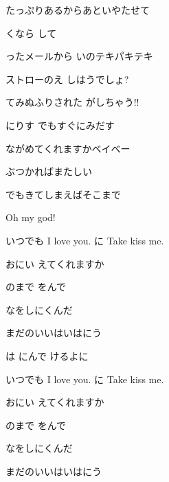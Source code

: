 \documentclass[14pt]{ltjsarticle}
\begin{document}
{  たっぷりあるからあといやたせて
  \jisho{}

\item
  くなら して
  \jisho{}

  ったメールから いのテキパキテキ
  \jisho{}

  ストローのえ しはうでしょ?
  \jisho{}

  てみぬふりされた がしちゃう!!
  \jisho{}

  にりす でもすぐにみだす
  \jisho{}

  ながめてくれますかベイベー
  \jisho{}

  ぶつかればまたしい
  \jisho{}

  でもきてしまえばそこまで
  \jisho{}

  Oh my god!
  \jisho{}

\item
  いつでも I love you. に Take kiss me.
  \jisho{}

  おにい えてくれますか
  \jisho{}

  のまで をんで
  \jisho{}

  なをしにくんだ
  \jisho{}

  まだのいいはいはにう
  \jisho{}

  は にんで けるよに
  \jisho{}

\item
  いつでも I love you. に Take kiss me.
  \jisho{}

  おにい えてくれますか
  \jisho{}

  のまで をんで
  \jisho{}

  なをしにくんだ
  \jisho{}

  まだのいいはいはにう
  \jisho{}

}
\end{document}
